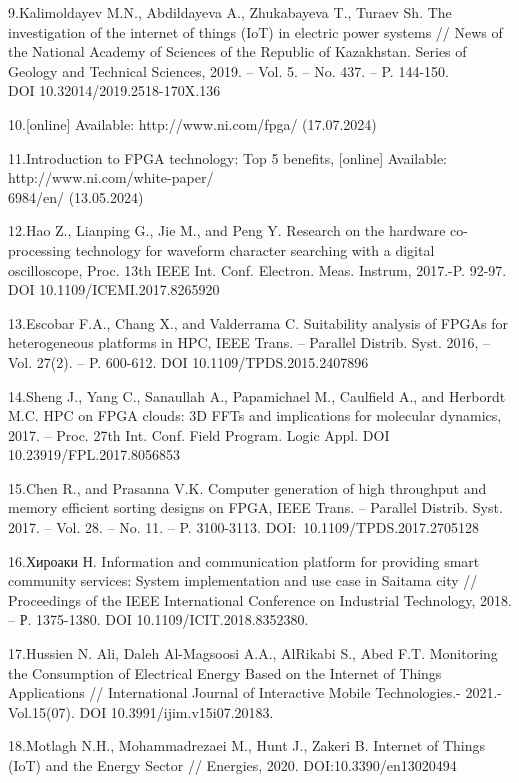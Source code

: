\begin{noparindent}
9.Kalimoldayev M.N., Abdildayeva A., Zhukabayeva T., Turaev Sh. The
investigation of the internet of things (IoT) in electric power systems // News of the
National Academy of Sciences of the Republic of Kazakhstan. Series of
Geology and Technical Sciences, 2019. -- Vol. 5. -- No. 437. -- P.
144-150.\\ DOI 10.32014/2019.2518-170X.136

10.{[}online{]} Available: http://www.ni.com/fpga/ (17.07.2024)

11.Introduction to FPGA technology: Top 5 benefits, {[}online{]}
Available: http://www.ni.com/white-paper/\\6984/en/ (13.05.2024)

12.Hao Z., Lianping G., Jie M., and Peng Y. Research on the hardware
co-processing technology for waveform character searching with a digital
oscilloscope, Proc. 13th IEEE Int. Conf. Electron. Meas. Instrum,
2017.-P. 92-97. DOI 10.1109/ICEMI.2017.8265920

13.Escobar F.A., Chang X., and Valderrama C. Suitability analysis of
FPGAs for heterogeneous platforms in HPC, IEEE Trans. -- Parallel
Distrib. Syst. 2016, -- Vol. 27(2). -- P. 600-612. DOI 10.1109/TPDS.2015.2407896

14.Sheng J., Yang C., Sanaullah A., Papamichael M., Caulfield A., and
Herbordt M.C. HPC on FPGA clouds: 3D FFTs and implications for molecular
dynamics, 2017. -- Proc. 27th Int. Conf. Field Program. Logic Appl. DOI
10.23919/FPL.2017.8056853

15.Chen R., and Prasanna V.K. Computer generation of high throughput and
memory efficient sorting designs on FPGA, IEEE Trans. -- Parallel
Distrib. Syst. 2017. -- Vol. 28. -- No. 11. -- P. 3100-3113.
DOI:~10.1109/TPDS.2017.2705128

16.Хироаки Н. Information and communication platform for providing smart
community services: System implementation and use case in Saitama city
// Proceedings of the IEEE International Conference on Industrial
Technology, 2018. -- Р. 1375-1380. DOI 10.1109/ICIT.2018.8352380.

17.Hussien N. Ali, Daleh Al-Magsoosi A.A., AlRikabi S., Abed F.T.
Monitoring the Consumption of Electrical Energy Based on the Internet of
Things Applications // International Journal of Interactive Mobile
Technologies.- 2021.-Vol.15(07). DOI 10.3991/ijim.v15i07.20183.

18.Motlagh N.H., Mohammadrezaei M., Hunt J., Zakeri B. Internet of
Things (IoT) and the Energy Sector // Energies, 2020.
DOI:10.3390/en13020494


\end{noparindent}
